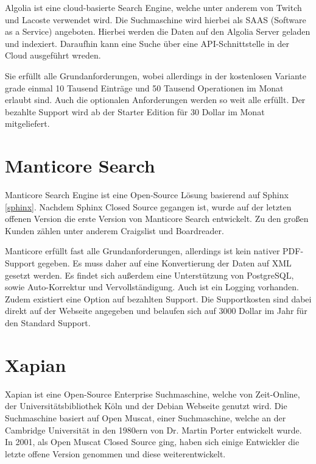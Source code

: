 Algolia ist eine cloud-basierte Search Engine, welche unter anderem von Twitch und Lacoste verwendet wird. Die Suchmaschine wird hierbei als SAAS (Software as a Service) angeboten. Hierbei werden die Daten auf den Algolia Server geladen und indexiert. Daraufhin kann eine Suche über eine API-Schnittstelle in der Cloud ausgeführt wreden.

Sie erfüllt alle Grundanforderungen, wobei allerdings in der kostenlosen Variante grade einmal 10 Tausend Einträge und 50 Tausend Operationen im Monat erlaubt sind. Auch die optionalen Anforderungen werden so weit alle erfüllt. Der bezahlte Support wird ab der Starter Edition für 30 Dollar im Monat mitgeliefert. \cite{Algolia.2019}

\section{Manticore Search}
\label{manticore}

Manticore Search Engine ist eine Open-Source Lösung basierend auf Sphinx \ref{sphinx}. Nachdem Sphinx Closed Source gegangen ist, wurde auf der letzten offenen Version die erste Version von Manticore Search entwickelt. Zu den großen Kunden zählen unter anderem Craigslist und Boardreader.

Manticore erfüllt fast alle Grundanforderungen, allerdings ist kein nativer PDF-Support gegeben. Es muss daher auf eine Konvertierung der Daten auf XML gesetzt werden. Es findet sich außerdem eine Unterstützung von PostgreSQL, sowie Auto-Korrektur und Vervollständigung. Auch ist ein Logging vorhanden. Zudem existiert eine Option auf bezahlten Support. Die Supportkosten sind dabei direkt auf der Webseite angegeben und belaufen sich auf 3000 Dollar im Jahr für den Standard Support. \cite{ManticoreSoftwareLtd.2019}

\section{Xapian}
\label{xapian}

Xapian ist eine Open-Source Enterprise Suchmaschine, welche von Zeit-Online, der Universitätsbibliothek Köln und der Debian Webseite genutzt wird. Die Suchmaschine basiert auf Open Muscat, einer Suchmaschine, welche an der Cambridge Universität in den 1980ern von Dr. Martin Porter entwickelt wurde. In 2001, als Open Muscat Closed Source ging, haben sich einige Entwickler die letzte offene Version genommen und diese weiterentwickelt.

